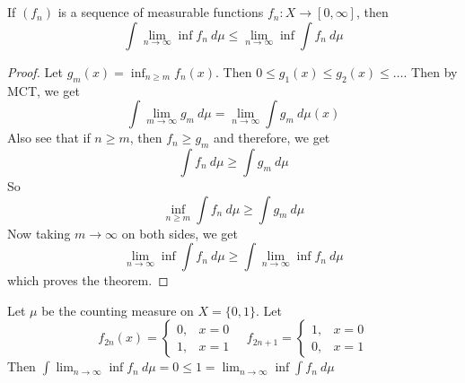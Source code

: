 
\chapter{}

\begin{theorem}
  If $(f_n)$ is a sequence of measurable functions $f_n: X \to [0, \infty]$, then \[
        \int \lim_{n \to \infty} \inf f_n \ d \mu \le \lim_{n \to \infty} \inf \int  f_n \ d \mu
  \]
\end{theorem}
\begin{proof}
  Let $g_m(x) = \inf_{n \ge m} f_n(x)$. Then $0 \le g_1(x) \le g_2(x) \le \ldots$. Then by MCT, we get \[
       \int \lim_{m \to \infty} g_m \ d \mu = \lim_{n \to \infty} \int  g_m \ d \mu(x)
  \]
  Also see that if $n \ge m$, then $f_n \ge g_m$ and therefore, we get \[
       \int  f_n \ d \mu \ge \int  g_m \ d \mu
  \]
  So \[
    \inf_{n \ge m} \int  f_n \ d \mu \ge \int g_m \ d \mu
  \]
  Now taking $m \to \infty$ on both sides, we get \[
    \lim_{n \to \infty} \inf \int  f_n \ d \mu \ge \int \lim_{n \to \infty} \inf f_n\ d \mu
  \]
  which proves the theorem.
\end{proof}

\begin{example}
  Let $\mu$ be the counting measure on $X = \{ 0, 1 \}$. Let \[
    f_{2n}(x) = \begin{cases}
      0, & x = 0 \\ 
      1, & x = 1
    \end{cases} \quad 
    f_{2n+1} = \begin{cases}
      1, & x = 0 \\ 
      0, & x = 1
    \end{cases}
  \]
  Then $\int \lim_{n \to \infty} \inf f_n \ d \mu = 0 \le 1 = \lim_{n \to \infty} \inf \int  f_n \ d \mu$
\end{example}

